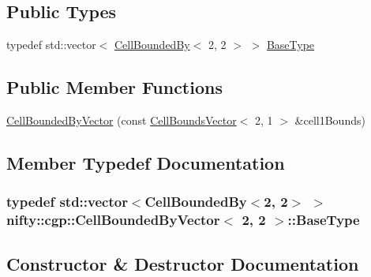 \subsection*{Public Types}
\begin{DoxyCompactItemize}
\item 
typedef std\+::vector$<$ \hyperlink{classnifty_1_1cgp_1_1CellBoundedBy}{Cell\+Bounded\+By}$<$ 2, 2 $>$ $>$ \hyperlink{classnifty_1_1cgp_1_1CellBoundedByVector_3_012_00_012_01_4_acf1174515755206bce20310f87af4747}{Base\+Type}
\end{DoxyCompactItemize}
\subsection*{Public Member Functions}
\begin{DoxyCompactItemize}
\item 
\hyperlink{classnifty_1_1cgp_1_1CellBoundedByVector_3_012_00_012_01_4_af6f91256e589a2504b9362c4da176893}{Cell\+Bounded\+By\+Vector} (const \hyperlink{classnifty_1_1cgp_1_1CellBoundsVector}{Cell\+Bounds\+Vector}$<$ 2, 1 $>$ \&cell1\+Bounds)
\end{DoxyCompactItemize}


\subsection{Member Typedef Documentation}
\hypertarget{classnifty_1_1cgp_1_1CellBoundedByVector_3_012_00_012_01_4_acf1174515755206bce20310f87af4747}{}
\subsubsection[{Base\+Type}]{\setlength{\rightskip}{0pt plus 5cm}typedef std\+::vector$<${\bf Cell\+Bounded\+By}$<$2, 2$>$ $>$ {\bf nifty\+::cgp\+::\+Cell\+Bounded\+By\+Vector}$<$ 2, 2 $>$\+::{\bf Base\+Type}}\label{classnifty_1_1cgp_1_1CellBoundedByVector_3_012_00_012_01_4_acf1174515755206bce20310f87af4747}


\subsection{Constructor \& Destructor Documentation}
\hypertarget{classnifty_1_1cgp_1_1CellBoundedByVector_3_012_00_012_01_4_af6f91256e589a2504b9362c4da176893}{}

